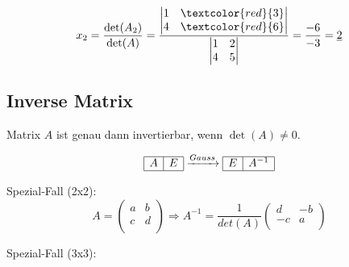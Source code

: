 \[
	x_2 = \frac{\det(A_2)}{\det(A)} = \frac{
		\begin{vmatrix}
			1 & \textcolor{red}{3} \\
			4 & \textcolor{red}{6}
		\end{vmatrix}
	}{
		\begin{vmatrix}
			1 & 2 \\
			4 & 5
		\end{vmatrix}
	}
	=
	\frac{-6}{-3}
	= \underline{2}
\]


\subsection{Inverse Matrix}\label{inversematrix}
Matrix $A$ ist genau dann invertierbar, wenn $\det(A) \neq 0$. 

\[
\begin{array}{|c|c|} \hline A & E \\ \hline \end{array} \xrightarrow{Gauss}
\begin{array}{|c|c|} \hline E & A^{-1} \\ \hline \end{array} 
\]

\noindent
Spezial-Fall (2x2):
\[
	A = \begin{pmatrix}
		a & b \\
		c & d \\
	\end{pmatrix}
   \Rightarrow 
    A^{-1} =\frac{1}{det(A)}
	\begin{pmatrix}
		d & -b \\
		-c & a \\
	\end{pmatrix}
\]

\noindent
Spezial-Fall (3x3):

